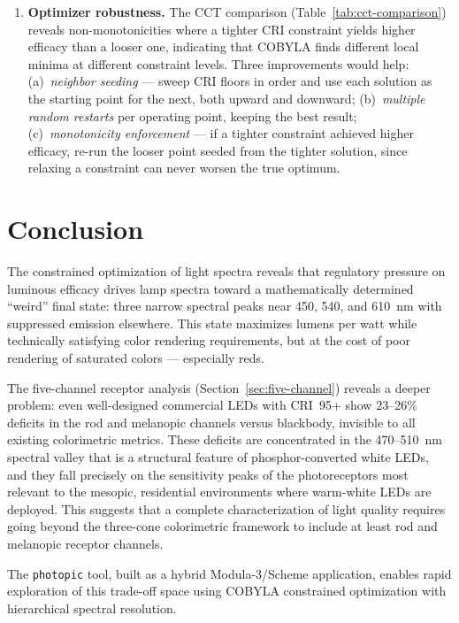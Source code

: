 \documentclass[11pt]{article}
\begin{document}
\begin{enumerate}
\item \textbf{Optimizer robustness.}  The CCT comparison
  (Table~\ref{tab:cct-comparison}) reveals non-monotonicities where a
  tighter CRI constraint yields higher efficacy than a looser one,
  indicating that COBYLA finds different local minima at different
  constraint levels.  Three improvements would help:
  (a)~\emph{neighbor seeding} --- sweep CRI floors in order and use each
  solution as the starting point for the next, both upward and downward;
  (b)~\emph{multiple random restarts} per operating point, keeping the
  best result;
  (c)~\emph{monotonicity enforcement} --- if a tighter constraint
  achieved higher efficacy, re-run the looser point seeded from the
  tighter solution, since relaxing a constraint can never worsen the
  true optimum.
\end{enumerate}

\section{Conclusion}

The constrained optimization of light spectra reveals that regulatory
pressure on luminous efficacy drives lamp spectra toward a mathematically
determined ``weird'' final state: three narrow spectral peaks near 450,
540, and 610~nm with suppressed emission elsewhere.  This state maximizes
lumens per watt while technically satisfying color rendering requirements,
but at the cost of poor rendering of saturated colors --- especially reds.

The five-channel receptor analysis (Section~\ref{sec:five-channel})
reveals a deeper problem: even well-designed commercial LEDs with
CRI~95+ show 23--26\% deficits in the rod and melanopic channels versus
blackbody, invisible to all existing colorimetric metrics.  These deficits
are concentrated in the 470--510~nm spectral valley that is a structural
feature of phosphor-converted white LEDs, and they fall precisely on the
sensitivity peaks of the photoreceptors most relevant to the mesopic,
residential environments where warm-white LEDs are deployed.  This
suggests that a complete characterization of light quality requires
going beyond the three-cone colorimetric framework to include at least
rod and melanopic receptor channels.

The \texttt{photopic} tool, built as a hybrid Modula-3/Scheme application,
enables rapid exploration of this trade-off space using COBYLA constrained
optimization with hierarchical spectral resolution.
\end{document}

